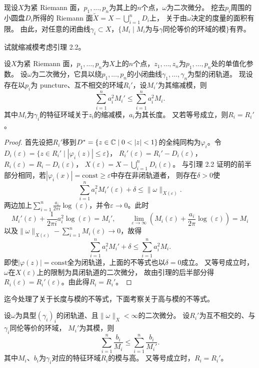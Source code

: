 
现设$X$为紧 Riemann 面，$p_1,\dots,p_n$为其上的$n$个点，$\omega$为二次微分。
挖去$p_i$周围的小圆盘$D_i$所得的 Riemann 面$\tilde X=X-\bigcup_{i=1}^nD_i$上，
关于由$\omega$决定的度量的面积有限。
由此，对任意的闭曲线$\gamma_i\subset X$，$\{M_i\mid M_i$为与$\gamma$同伦等价的环域的模$\}$有界。

试就缩减模考虑引理 2.2。

\begin{lemma}
设$X$为紧 Riemann 面，$p_1,\dots,p_n$为$X$上的$n$个点，$z_1,\dots,z_n$为$p_1,\dots,p_n$处的单值化参数。
设$\omega$为二次微分，它具以绕$p_1,\dots,p_n$的小闭曲线$\gamma_1,\dots,\gamma_n$为型的闭轨道。
现设存在以$p_i$为 puncture、互不相交的环域$R_i'$，设$M_i'$为其缩减模，则
\[
\sum_{i=1}^n a_i^2M_i'\le\sum_{i=1}^n a_i^2M_i.
\]
其中$M_i$为$\gamma_i$的特征环域关于$z_i$的缩减模，$a_i$为其长度。
又若等号成立，则$R_i=R_i'$。
\end{lemma}

\begin{proof}
首先设把$R_i'$移到$D^*=\{z\in\C\mid0<|z|<1\}$的全纯同构为$\varphi_i$。令
$D_i(\varepsilon)=\{z\in R_i'\mid|\varphi_i(z)|\le\varepsilon\}$，
$R_i'(\varepsilon)=R_i'-D_i(\varepsilon)$，$R_i(\varepsilon)=R_i-D_i(\varepsilon)$，
$X(\varepsilon)=X-\bigcup_{i=1}^nD_i(\varepsilon)$。
与引理 2.2 证明的前半部分相同，若$|\varphi_i(x)|=\mathrm{const}\ge\varepsilon$中存在非闭轨道者，
则存在$\delta>0$使
\[
\sum_{i=1}^n a_i^2M_i'(\varepsilon)+\delta\le\|\omega\|_{X(\varepsilon)}.
\]
两边加上$\sum_{i=1}^n\frac{a_i}{2\pi i}\log(\varepsilon)$，并令$\varepsilon\to0$。此时
\[
M_i'(\varepsilon)+\frac{1}{2\pi i}a_i^2\log(\varepsilon)=M_i',\qquad
\lim_{\varepsilon\to\infty}\left(M_i(\varepsilon)+\frac{a_i}{2\pi}\log(\varepsilon)\right)=M_i
\]
以及$\|\omega\|_{X(\varepsilon)}-\sum_{i=1}^nM_i(\varepsilon)\to0$，故得
\[
\sum_{i=1}^n a_i^2M_i'+\delta\le\sum_{i=1}^n a_i^2M_i.
\]
即使$|\varphi(z)|=\mathrm{const}$全为闭轨道，上面的不等式也以$\delta=0$成立。
又等号成立时，$\omega$在$X(\varepsilon)$上的限制为具闭轨道的二次微分，
故由引理的后半部分得$R_i(\varepsilon)=R_i'(\varepsilon)$。由此得$R_i=R_i'$。
\end{proof}


迄今处理了关于长度与模的不等式，下面考察关于高与模的不等式。

\begin{theorem}
设$\omega$为具型$(\gamma_i)_i$的闭轨道、且$\|\omega\|_X<\infty$的二次微分。
设$R_i'$为互不相交的、与$\gamma_i$同伦等价的环域，
$M_i'$为其模，则
\[
\sum_{i=1}^n\frac{b_i}{M_i}\le\sum_{i=1}^n\frac{b_i}{M_i'}.
\]
其中$M_i$、$b_i$为$\gamma_i$对应的特征环域$R_i$的模与高。
又等号成立时，$R_i=R_i'$。
\end{theorem}
